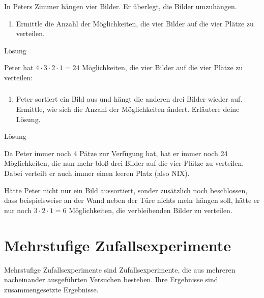 \documentclass[
  ngerman,
]{book}
\providecommand{\tightlist}{%
  \setlength{\itemsep}{0pt}\setlength{\parskip}{0pt}}
\begin{document}
In Peters Zimmer hängen vier Bilder. Er überlegt, die Bilder umzuhängen.

\begin{enumerate}
\def\labelenumi{\alph{enumi})}
\tightlist
\item
  Ermittle die Anzahl der Möglichkeiten, die vier Bilder auf die vier Plätze zu verteilen.
\end{enumerate}

Lösung

Peter hat \(4 \cdot 3 \cdot 2 \cdot 1= 24\) Möglichkeiten, die vier Bilder auf die vier Plätze zu verteilen:

\hypertarget{section-109}{%
\subsubsection*{}\label{section-109}}

\begin{enumerate}
\def\labelenumi{\alph{enumi})}
\setcounter{enumi}{1}
\tightlist
\item
  Peter sortiert ein Bild aus und hängt die anderen drei Bilder wieder auf. Ermittle, wie sich die Anzahl der Möglichkeiten ändert. Erläutere deine Lösung.
\end{enumerate}

Lösung

Da Peter immer noch 4 Pätze zur Verfügung hat, hat er immer noch 24 Möglichkeiten, die nun mehr bloß drei Bilder auf die vier Plätze zu verteilen. Dabei verteilt er auch immer einen leeren Platz (also NIX).

Hätte Peter nicht nur ein Bild aussortiert, sonder zusätzlich noch beschlossen, dass beispielsweise an der Wand neben der Türe nichts mehr hängen soll, hätte er nur noch \(3 \cdot 2 \cdot 1 = 6\) Möglichkeiten, die verbleibenden Bilder zu verteilen.

\hypertarget{section-110}{%
\subsubsection*{}\label{section-110}}

\hypertarget{mehrstufige-zufallsexperimente}{%
\section{Mehrstufige Zufallsexperimente}\label{mehrstufige-zufallsexperimente}}

Mehrstufige Zufallsexperimente sind Zufallsexperimente, die aus mehreren nacheinander ausgeführten Versuchen bestehen. Ihre Ergebnisse sind zusammengesetzte Ergebnisse.
\end{document}
